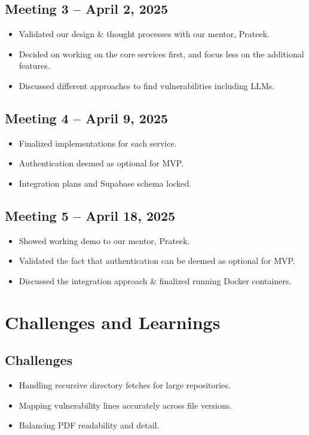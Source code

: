 \documentclass{article}
\begin{document}
\subsection{Meeting 3 – April 2, 2025}
\begin{itemize}
    \item Validated our design \& thought processes with our mentor, Prateek.
    \item Decided on working on the core services first, and focus less on the additional features.
    \item Discussed different approaches to find vulnerabilities including LLMs.
\end{itemize}

\subsection{Meeting 4 – April 9, 2025}
\begin{itemize}
    \item Finalized implementations for each service.
    \item Authentication deemed as optional for MVP.
    \item Integration plans and Supabase schema locked.
\end{itemize}

\subsection{Meeting 5 – April 18, 2025}
\begin{itemize}
    \item Showed working demo to our mentor, Prateek.
    \item Validated the fact that authentication can be deemed as optional for MVP.
    \item Discussed the integration approach \& finalized running Docker containers.
\end{itemize}

\section{Challenges and Learnings}

\subsection{Challenges}
\begin{itemize}
    \item Handling recursive directory fetches for large repositories.
    \item Mapping vulnerability lines accurately across file versions.
    \item Balancing PDF readability and detail.
\end{itemize}
\end{document}
